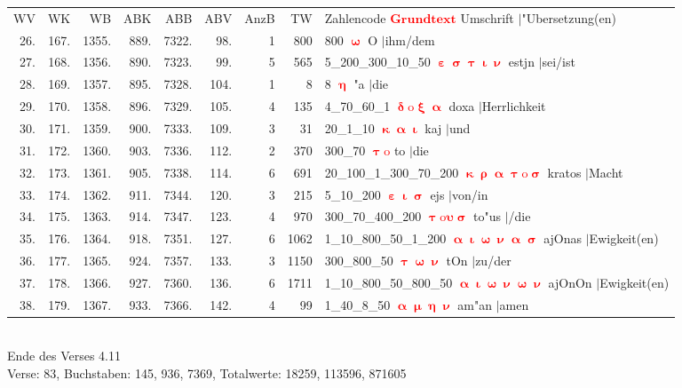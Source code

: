 \documentclass[a4paper,10pt,landscape]{article}
\begin{document}
\begin{tabular}{rrrrrrrrp{120mm}}
WV&WK&WB&ABK&ABB&ABV&AnzB&TW&Zahlencode \textcolor{red}{$\boldsymbol{Grundtext}$} Umschrift $|$"Ubersetzung(en)\\
26.&167.&1355.&889.&7322.&98.&1&800&800 \textcolor{red}{$\boldsymbol{\upomega}$} O $|$ihm/dem\\
27.&168.&1356.&890.&7323.&99.&5&565&5\_200\_300\_10\_50 \textcolor{red}{$\boldsymbol{\upepsilon\upsigma\uptau\upiota\upnu}$} estjn $|$sei/ist\\
28.&169.&1357.&895.&7328.&104.&1&8&8 \textcolor{red}{$\boldsymbol{\upeta}$} "a $|$die\\
29.&170.&1358.&896.&7329.&105.&4&135&4\_70\_60\_1 \textcolor{red}{$\boldsymbol{\updelta\mathrm{o}\upxi\upalpha}$} doxa $|$Herrlichkeit\\
30.&171.&1359.&900.&7333.&109.&3&31&20\_1\_10 \textcolor{red}{$\boldsymbol{\upkappa\upalpha\upiota}$} kaj $|$und\\
31.&172.&1360.&903.&7336.&112.&2&370&300\_70 \textcolor{red}{$\boldsymbol{\uptau\mathrm{o}}$} to $|$die\\
32.&173.&1361.&905.&7338.&114.&6&691&20\_100\_1\_300\_70\_200 \textcolor{red}{$\boldsymbol{\upkappa\uprho\upalpha\uptau\mathrm{o}\upsigma}$} kratos $|$Macht\\
33.&174.&1362.&911.&7344.&120.&3&215&5\_10\_200 \textcolor{red}{$\boldsymbol{\upepsilon\upiota\upsigma}$} ejs $|$von/in\\
34.&175.&1363.&914.&7347.&123.&4&970&300\_70\_400\_200 \textcolor{red}{$\boldsymbol{\uptau\mathrm{o}\upsilon\upsigma}$} to"us $|$/die\\
35.&176.&1364.&918.&7351.&127.&6&1062&1\_10\_800\_50\_1\_200 \textcolor{red}{$\boldsymbol{\upalpha\upiota\upomega\upnu\upalpha\upsigma}$} ajOnas $|$Ewigkeit(en)\\
36.&177.&1365.&924.&7357.&133.&3&1150&300\_800\_50 \textcolor{red}{$\boldsymbol{\uptau\upomega\upnu}$} tOn $|$zu/der\\
37.&178.&1366.&927.&7360.&136.&6&1711&1\_10\_800\_50\_800\_50 \textcolor{red}{$\boldsymbol{\upalpha\upiota\upomega\upnu\upomega\upnu}$} ajOnOn $|$Ewigkeit(en)\\
38.&179.&1367.&933.&7366.&142.&4&99&1\_40\_8\_50 \textcolor{red}{$\boldsymbol{\upalpha\upmu\upeta\upnu}$} am"an $|$amen\\
\end{tabular}\medskip \\
Ende des Verses 4.11\\
Verse: 83, Buchstaben: 145, 936, 7369, Totalwerte: 18259, 113596, 871605\\
\end{document}
